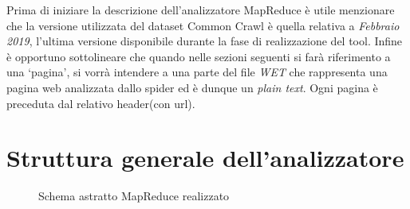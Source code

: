 \documentclass{article}
\newcommand{\MR}{MapReduce}
\newcommand{\WET}{\textit{WET}}
\newcommand{\CC}{Common Crawl}
\newcommand{\pt}{\textit{plain text}}
\begin{document}
Prima di iniziare la descrizione dell'analizzatore \MR{} è utile menzionare che la versione utilizzata del dataset \CC{} è quella relativa a \textit{Febbraio 2019}, l'ultima versione disponibile durante la fase di realizzazione del tool. Infine è opportuno sottolineare che quando nelle sezioni seguenti si farà riferimento a una `pagina', si vorrà intendere  a una parte del file \WET{} che rappresenta una pagina web analizzata dallo spider ed è dunque un \pt{}. Ogni pagina è preceduta dal relativo header(con url).

\newpage
\section{Struttura generale dell'analizzatore}

\begin{figure}[H]
   \centering
   
   \caption{Schema astratto \MR{} realizzato}
   \label{fig:mapreduce}
\end{figure}
\end{document}
